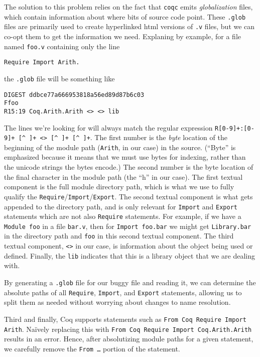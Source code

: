 \documentclass[sigplan,10pt,review,anonymous]{acmart}
\begin{document}
The solution to this problem relies on the fact that \verb|coqc| emits \emph{globalization} files, which contain information about where bits of source code point.
These \verb|.glob| files are primarily used to create hyperlinked html versions of \verb|.v| files, but we can co-opt them to get the information we need.
Explaning by example, for a file named \verb|foo.v| containing only the line
\begin{verbatim}
Require Import Arith.
\end{verbatim}
the \verb|.glob| file will be something like
\begin{verbatim}
DIGEST ddbce77a666953818a56ed89d87b6c03
Ffoo
R15:19 Coq.Arith.Arith <> <> lib
\end{verbatim}
The lines we're looking for will always match the regular expression \verb|R[0-9]+:[0-9]+ [^ ]+ <> [^ ]+ [^ ]+|.
The first number is the \emph{byte} location of the beginning of the module path (\verb|Arith|, in our case) in the source.
(``Byte'' is emphasized because it means that we must use bytes for indexing, rather than the unicode strings the bytes encode.)
The second number is the byte location of the final character in the module path (the ``h'' in our case).
The first textual component is the full module directory path, which is what we use to fully qualify the \verb|Require|/\verb|Import|/\verb|Export|.
The second textual component is what gets appended to the directory path, and is only relevant for \verb|Import| and \verb|Export| statements which are not also \verb|Require| statements.
For example, if we have a \verb|Module foo| in a file \verb|bar.v|, then for \verb|Import foo.bar| we might get \verb|Library.bar| in the directory path and \verb|foo| in this second textual component.
The third textual component, \verb|<>| in our case, is information about the object being used or defined.
Finally, the \verb|lib| indicates that this is a library object that we are dealing with.

By generating a \verb|.glob| file for our buggy file and reading it, we can determine the absolute paths of all \verb|Require|, \verb|Import|, and \verb|Export| statements, allowing us to split them as needed without worrying about changes to name resolution.

Third and finally, Coq supports statements such as \verb|From Coq Require Import Arith|.
Na\"ively replacing this with \verb|From Coq Require Import Coq.Arith.Arith| results in an error.
Hence, after absolutizing module paths for a given statement, we carefully remove the \texttt{From \ldots} portion of the statement.
\end{document}
